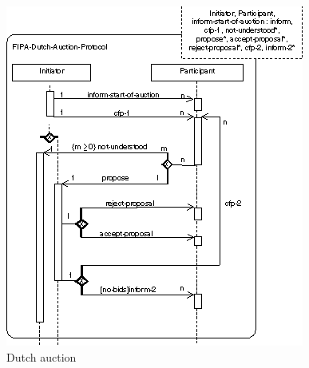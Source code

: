 \documentclass[a4paper, 11pt]{article}
\begin{document}
\begin{figure}[H]
	\caption{Dutch auction}
	\centering
	\includegraphics[scale=0.9]{./images/sequence-dutchauction.png}
\end{figure}
\end{document}

